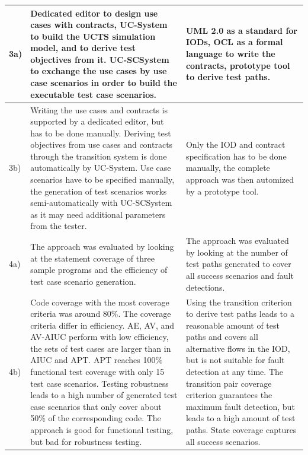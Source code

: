 \begin{small}
\begin{longtable}[h]{p{0.45cm}|p{}|p{}}
	\hline
	3a) & 
	Dedicated editor to design use cases with contracts, UC-System to build the UCTS simulation model, and to derive test objectives from it. UC-SCSystem to exchange the use cases by use case scenarios in order to build the executable test case scenarios. & 
	UML 2.0 as a standard for IODs, OCL as a formal language to write the contracts, prototype tool to derive test paths. \\
	\hline
	3b) & 
	Writing the use cases and contracts is supported by a dedicated editor, but has to be done manually. Deriving test objectives from use cases and contracts through the transition system is done automatically by UC-System. Use case scenarios have to be specified manually, the generation of test scenarios works semi-automatically with UC-SCSystem as it may need additional parameters from the tester. & 
	Only the IOD and contract specification has to be done manually, the complete approach was then automized by a prototype tool. \\
	\hline
	4a) & 
	The approach was evaluated by looking at the statement coverage of three sample programs and the efficiency of test case scenario generation. & 
	The approach was evaluated by looking at the number of test paths generated to cover all success scenarios and fault detections. \\
	\hline
	4b) &
	Code coverage with the most coverage criteria was around 80\%. The coverage criteria differ in efficiency. AE, AV, and AV-AIUC perform with low efficiency, the sets of test cases are larger than in AIUC and APT. APT reaches 100\% functional test coverage with only 15 test case scenarios. Testing robustness leads to a high number of generated test case scenarios that only cover about 50\% of the corresponding code. The approach is good for functional testing, but bad for robustness testing. &
	Using the transition criterion to derive test paths leads to a reasonable amount of test paths and covers all alternative flows in the IOD, but is not suitable for fault detection at any time. The transition pair coverage criterion guarantees the maximum fault detection, but leads to a high amount of test paths. State coverage captures all success scenarios. \\
	\hline
\end{longtable}
\end{small}

